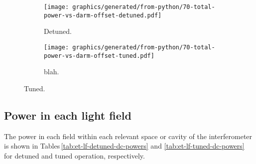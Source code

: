 \begin{figure}
  \centering
  \begin{subfigure}{.49\textwidth}
    \texttt{[image: graphics/generated/from-python/70-total-power-vs-darm-offset-detuned.pdf]}
    \caption[Carrier power at the output port of \ETLF{} in detuned configuration as a function of differential arm cavity offset]{\label{fig:total-power-vs-darm-offset-detuned}Detuned.}
  \end{subfigure}
  \hfill
  \begin{subfigure}{.49\textwidth}
    \texttt{[image: graphics/generated/from-python/70-total-power-vs-darm-offset-tuned.pdf]}
    \caption[Carrier power at the output port of \ETLF{} in tuned configuration as a function of differential arm cavity offset]{\label{fig:total-power-vs-darm-offset-tuned}blah.}
  \end{subfigure}
  \caption[Carrier power at the output port of \ETLF{} as a function of differential arm cavity offset]{\label{fig:total-power-vs-darm-offset}Tuned.}
\end{figure}


\subsection{Power in each light field}

The power in each field within each relevant space or cavity of the interferometer is shown in Tables\,\ref{tab:et-lf-detuned-dc-powers} and \ref{tab:et-lf-tuned-dc-powers} for detuned and tuned operation, respectively.

